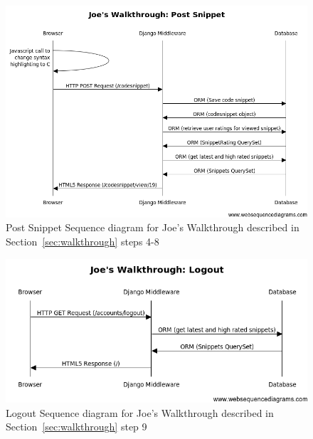 \documentclass{sig-alt-release2}
\begin{document}
\begin{figure}
\centering
\includegraphics[scale=0.6]{../imgs/walkthroughseqdiag-postsnippet.png}
\caption{Post Snippet Sequence diagram for Joe's Walkthrough described in
Section~\ref{sec:walkthrough} steps 4-8}
\label{fig:postseqdiag}
\end{figure}

\begin{figure}
\centering
\includegraphics[scale=0.6]{../imgs/walkthroughseqdiag-logout.png}
\caption{Logout Sequence diagram for Joe's Walkthrough described in
Section~\ref{sec:walkthrough} step 9}
\label{fig:logoutseqdiag}
\end{figure}
\end{document}
